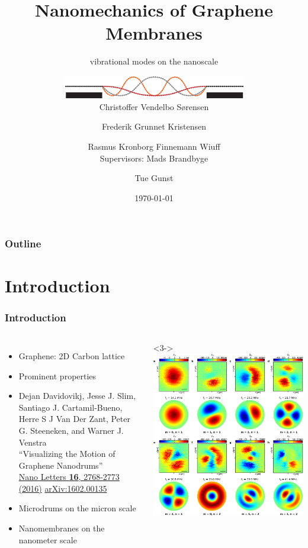 \documentclass[hyperref={colorlinks=true,urlcolor=blue,linkcolor=.},aspectratio=1610,mathserif]{beamer}
\title{Nanomechanics of Graphene Membranes}
\subtitle{vibrational modes on the nanoscale}
\author{\centering\includegraphics[width=8cm]{Miscellaneous/Graphics/Logo.eps}\\Christoffer Vendelbo Sørensen \and Frederik Grunnet Kristensen \and Rasmus Kronborg Finnemann Wiuff\\Supervisors: Mads Brandbyge \and Tue Gunst}
\institute{Technical University of Denmark}
\date{\today}
\begin{document}
\begin{frame}[plain]
 \titlepage
\end{frame}

\begin{frame}[plain]
 \frametitle{Outline}
 \tableofcontents
\end{frame}

\section{Introduction}

\begin{frame}
 \frametitle{Introduction}
 \begin{columns}[T]
  \begin{itemize}
   \item<1-> Graphene: 2D Carbon lattice
   \item<2-> Prominent properties
   \item<3-> Dejan Davidovikj, Jesse J. Slim, Santiago J. Cartamil-Bueno, Herre S J Van Der Zant, Peter G. Steeneken, and Warner J. Venstra\\
         “Visualizing the Motion of Graphene Nanodrums”\\
         \href{http://dx.doi.org/10.1021/acs.nanolett.6b00477}{Nano Letters \textbf{16}, 2768-2773 (2016)} \href{http://arxiv.org/abs/1602.00135}{arXiv:1602.00135}
   \item<4-> Microdrums on the micron scale
   \item<5-> Nanomembranes on the nanometer scale
  \end{itemize}
  <3->
  \includegraphics[width=\columnwidth]{Figures/motivation.eps}
 \end{columns}
\end{frame}
\end{document}
